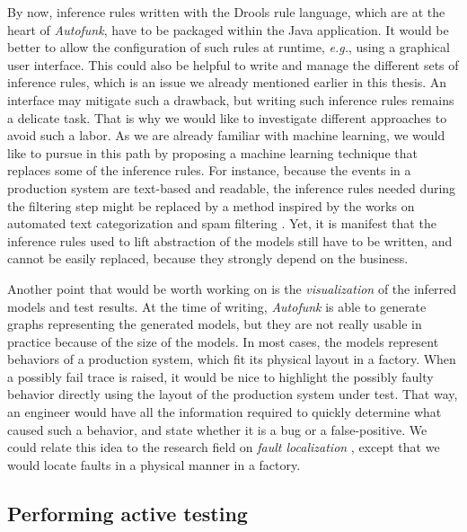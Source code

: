 By now, inference rules written with the Drools rule language,
which are at the heart of \emph{Autofunk}, have to be packaged
within the Java application. It would be better to allow the
configuration of such rules at runtime, \emph{e.g.}, using a
graphical user interface. This could also be helpful to write and
manage the different sets of inference rules, which is an issue
we already mentioned earlier in this thesis. An interface may
mitigate such a drawback, but writing such inference rules
remains a delicate task. That is why we would like to investigate
different approaches to avoid such a labor. As we are already
familiar with machine learning, we would like to pursue in this
path by proposing a machine learning technique that replaces some
of the inference rules. For instance, because the events in a
production system are text-based and readable, the inference
rules needed during the filtering step might be replaced by a
method inspired by the works on automated text categorization
\cite{Sebastiani:2002:MLA:505282.505283} and spam filtering
\cite{Guzella200910206}. Yet, it is manifest that the inference
rules used to lift abstraction of the models still have to be
written, and cannot be easily replaced, because they strongly
depend on the business.

Another point that would be worth working on is the
\emph{visualization} of the inferred models and test results. At
the time of writing, \emph{Autofunk} is able to generate graphs
representing the generated models, but they are not really usable
in practice because of the size of the models. In most cases, the
models represent behaviors of a production system, which fit its
physical layout in a factory. When a possibly fail trace is
raised, it would be nice to highlight the possibly faulty
behavior directly using the layout of the production system under
test. That way, an engineer would have all the information
required to quickly determine what caused such a behavior, and
state whether it is a bug or a false-positive. We could relate
this idea to the research field on \emph{fault localization}
\cite{jones2002visualization,wong2010software}, except that we
would locate faults in a physical manner in a factory.


\subsection{Performing active testing}
\label{sec:conclusion:testing:active}

